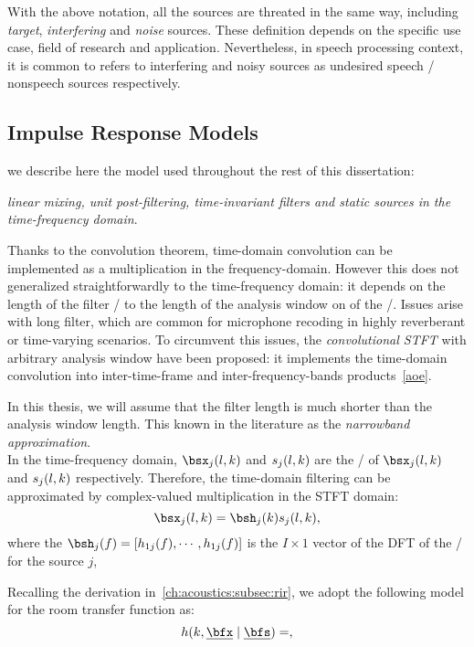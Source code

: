 With the above notation, all the sources are threated in the same way, including \textit{target}, \textit{interfering} and \textit{noise} sources.
These definition depends on the specific use case, field of research and application.
Nevertheless, in speech processing context,
it is common to refers to interfering and noisy sources as undesired speech \vs/ nonspeech sources respectively.

\subsection{Impulse Response Models}
we describe here the model used throughout the rest of this dissertation:
\begin{center}
    \textit{linear mixing, unit post-filtering, time-invariant filters and static sources in the time-frequency domain}.
\end{center}

Thanks to the convolution theorem, time-domain convolution can be implemented as a multiplication in the frequency-domain.
However this does not generalized straightforwardly to the time-frequency domain:
it depends on the length of the filter \wrt/ to the length of the analysis window on of the \STFT/.
Issues arise with long filter, which are common for microphone recoding in highly reverberant or time-varying scenarios.
To circumvent this issues, the \textit{convolutional STFT} with arbitrary analysis window have been proposed:
it implements the time-domain convolution into inter-time-frame and inter-frequency-bands products~\cref{aoe}.

In this thesis, we will assume that the filter length is much shorter than the analysis window length.
This known in the literature as the \textit{narrowband approximation}\cite{}.
\\In the time-frequency domain, $\mics_j(l,k)$  and $s_j(l,k)$ are the \STFT/ of $\mics_j(l,k)$ and $s_j(l,k)$ respectively.
Therefore, the time-domain filtering can be approximated by complex-valued multiplication in the STFT domain:
\begin{equation}
    \mics_j(l,k) = \bsh_j(k) \src_j(l,k)
    ,
\end{equation}
where the $\bsh_j(f) = \klist{h_{1j}(f), \cdots, h_{1j}(f)}$ is the $I \times 1$ vector of the DFT of the
\RIRs/ for the source $j$,

Recalling the derivation in~\cref{ch:acoustics:subsec:rir}, we adopt the following model for the room transfer function as:
\begin{equation}
    \rir (k, \positionMicrophone \mid \positionSource) =
    ,
\end{equation}

